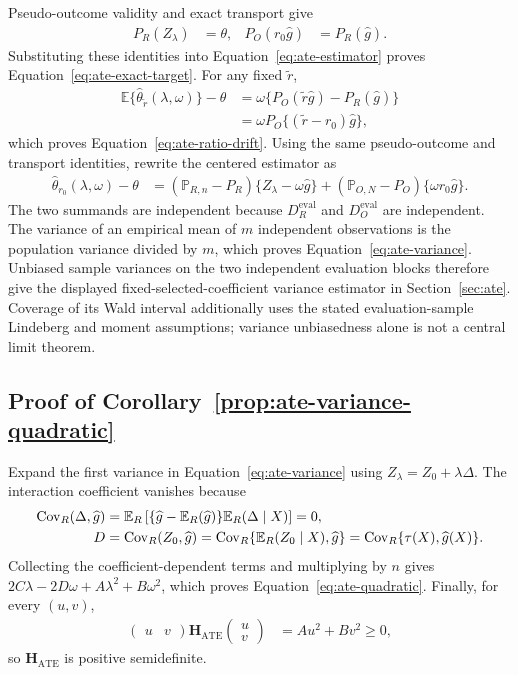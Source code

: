 Pseudo-outcome validity and exact transport give
\begin{align*}
P_R(Z_\lambda)&=\theta,
&
P_O(r_0\widehat{g})&=P_R(\widehat{g}).
\end{align*}
Substituting these identities into Equation~\eqref{eq:ate-estimator} proves
Equation~\eqref{eq:ate-exact-target}. For any fixed $\widetilde r$,
\begin{align*}
\mathbb E\{\widehat\theta_{\widetilde r}(\lambda,\omega)\}-\theta
&=\omega\{P_O(\widetilde r \widehat{g})-P_R(\widehat{g})\}
\\
&=\omega P_O\{(\widetilde r-r_0)\widehat{g}\},
\end{align*}
which proves Equation~\eqref{eq:ate-ratio-drift}. Using
the same pseudo-outcome and transport identities, rewrite the centered estimator as
\begin{align}
\widehat\theta_{r_0}(\lambda,\omega)-\theta
&=
(\mathbb P_{R,n}-P_R)\{Z_\lambda-\omega \widehat{g}\}
+(\mathbb P_{O,N}-P_O)\{\omega r_0\widehat{g}\}.
\end{align}
The two summands are independent because $D_R^{\mathrm{eval}}$ and
$D_O^{\mathrm{eval}}$ are
independent. The variance of
an empirical mean of $m$ independent observations is the population variance
divided by $m$, which proves Equation~\eqref{eq:ate-variance}.  Unbiased sample
variances on the two independent evaluation blocks therefore give the displayed
fixed-selected-coefficient variance estimator in Section~\ref{sec:ate}. Coverage
of its Wald interval additionally uses the stated evaluation-sample Lindeberg and
moment assumptions; variance unbiasedness alone is not a central limit theorem.

\subsection{Proof of Corollary~\ref{prop:ate-variance-quadratic}}

Expand the first variance in Equation~\eqref{eq:ate-variance} using
$Z_\lambda=Z_0+\lambda\Delta$. The interaction coefficient vanishes because
\begin{align}
\operatorname{Cov}_R(\Delta,\widehat{g})
&=
\mathbb E_R\left[
\{\widehat{g}-\mathbb E_R(\widehat{g})\}\mathbb E_R(\Delta\mid X)
\right]
 =0,
\notag\\
D
&=\operatorname{Cov}_R(Z_0,\widehat{g})
=\operatorname{Cov}_R\{\mathbb E_R(Z_0\mid X),\widehat{g}\}
=\operatorname{Cov}_R\{\tau(X),\widehat{g}(X)\}.
\label{eq:ate-population-separation}
\end{align}
Collecting the coefficient-dependent terms and multiplying by $n$ gives
$2C\lambda-2D\omega+A\lambda^2+B\omega^2$, which proves
Equation~\eqref{eq:ate-quadratic}. Finally, for every $(u,v)$,
\begin{align*}
\begin{pmatrix}u&v\end{pmatrix}
\mathbf H_{\mathrm{ATE}}
\begin{pmatrix}u\\v\end{pmatrix}
&=Au^2+Bv^2\geq0,
\end{align*}
so $\mathbf H_{\mathrm{ATE}}$ is positive semidefinite.


